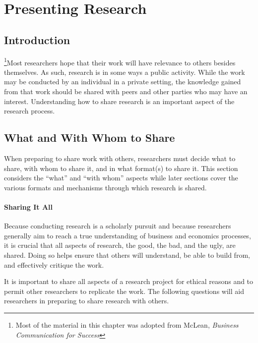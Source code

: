 \chapter{Presenting Research}

\section{Introduction}

\footnote{Most of the material in this chapter was adopted from McLean, \textit{Business Communication for Success}\cite{mclean2012business}}Most researchers hope that their work will have relevance to others besides themselves. As such, research is in some ways a public activity. While the work may be conducted by an individual in a private setting, the knowledge gained from that work should be shared with  peers and other parties who may have an interest. Understanding how to share research is an important aspect of the research process.

\section{What and With Whom to Share}

When preparing to share work with others, researchers must decide what to share, with whom to share it, and in what format(s) to share it. This section considers the ``what'' and ``with whom'' aspects while later sections cover the various formats and mechanisms through which research is shared.

\subsubsection{Sharing It All}

Because conducting research is a scholarly pursuit and because researchers generally aim to reach a true understanding of business and economics processes, it is crucial that all aspects of research, the good, the bad, and the ugly, are shared. Doing so helps ensure that others will understand, be able to build from, and effectively critique the work.

It is important to share all aspects of a research project for ethical reasons and to permit other researchers to replicate the work. The following questions will aid researchers in preparing to share research with others.

